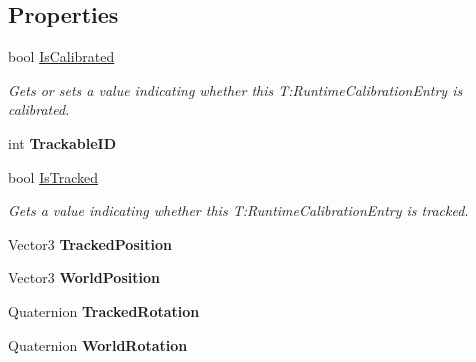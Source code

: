\subsection*{Properties}
\begin{DoxyCompactItemize}
\item 
bool \mbox{\hyperlink{class_ximmerse_1_1_rhino_x_1_1_runtime_calibration_entity_a4089f89a884f71bd451b27d38ab978d0}{Is\+Calibrated}}
\begin{DoxyCompactList}\small\item\em Gets or sets a value indicating whether this T\+:\+Runtime\+Calibration\+Entry is calibrated. \end{DoxyCompactList}\item 
\mbox{\label{class_ximmerse_1_1_rhino_x_1_1_runtime_calibration_entity_af2d6869b466b8f5f0ead7eb434b95402}} 
int {\bfseries Trackable\+ID}
\item 
bool \mbox{\hyperlink{class_ximmerse_1_1_rhino_x_1_1_runtime_calibration_entity_ad9cfbd99981ebb2a69e1c5e8d6f5c92d}{Is\+Tracked}}
\begin{DoxyCompactList}\small\item\em Gets a value indicating whether this T\+:\+Runtime\+Calibration\+Entry is tracked. \end{DoxyCompactList}\item 
\mbox{\label{class_ximmerse_1_1_rhino_x_1_1_runtime_calibration_entity_a67a1202425a0a0bbe3c87539fb3117a3}} 
Vector3 {\bfseries Tracked\+Position}
\item 
\mbox{\label{class_ximmerse_1_1_rhino_x_1_1_runtime_calibration_entity_ab7958796c66a525f239f487e83067204}} 
Vector3 {\bfseries World\+Position}
\item 
\mbox{\label{class_ximmerse_1_1_rhino_x_1_1_runtime_calibration_entity_a59600142d6877b258221cfe5bb30ac3a}} 
Quaternion {\bfseries Tracked\+Rotation}
\item 
\mbox{\label{class_ximmerse_1_1_rhino_x_1_1_runtime_calibration_entity_a2b3850e48467f3c67eab5652cbfbc7ee}} 
Quaternion {\bfseries World\+Rotation}
\end{DoxyCompactItemize}
